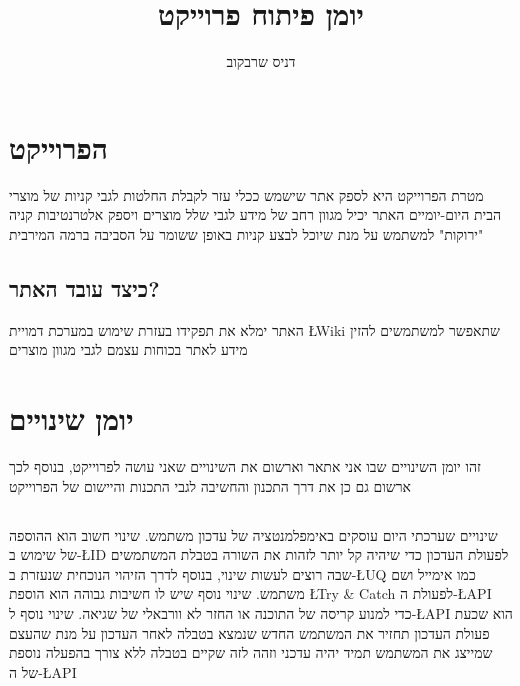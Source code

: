 \documentclass{article}
\title{יומן פיתוח פרוייקט}
\author{דניס שרבקוב}
\date{\displaydate{Initialcreation}}
\begin{document}
\maketitle

\tableofcontents

\newpage
\section{הפרוייקט}
מטרת הפרוייקט היא לספק אתר שישמש ככלי עזר לקבלת החלטות לגבי קניות של מוצרי הבית היום-יומיים האתר יכיל מגוון רחב של מידע לגבי שלל מוצרים ויספק אלטרנטיבות קניה "ירוקות" למשתמש על מנת שיוכל לבצע קניות באופן ששומר על הסביבה ברמה המירבית
\subsection{כיצד עובד האתר?}
האתר ימלא את תפקידו בעזרת שימוש במערכת דמויית \L{Wiki} שתאפשר למשתמשים להזין מידע לאתר בכוחות עצמם לגבי מגוון מוצרים
\newpage

\section{יומן שינויים}
זהו יומן השינויים שבו אני אתאר וארשום את השינויים שאני עושה לפרוייקט, בנוסף לכך ארשום גם כן את דרך התכנון והחשיבה לגבי התכנות והיישום של הפרוייקט 

\subsection{\protect{}}

שינויים שערכתי היום עוסקים באימפלמנטציה של עדכון משתמש. שינוי חשוב הוא ההוספה של שימוש ב-\L{ID} לפעולת העדכון כדי שיהיה קל יותר לזהות את השורה בטבלת המשתמשים שבה רוצים לעשות שינוי, בנוסף לדרך הזיהוי הנוכחית שנעזרת ב-\L{UQ} כמו אימייל ושם משתמש. שינוי נוסף שיש לו חשיבות גבוהה הוא הוספת \L{Try \& Catch} לפעולת ה-\L{API} כדי למנוע קריסה של התוכנה או החזר לא וורבאלי של שגיאה. שינוי נוסף ל-\L{API} הוא שכעת פעולת העדכון תחזיר את המשתמש החדש שנמצא בטבלה לאחר העדכון על מנת שהעצם שמייצג את המשתמש תמיד יהיה עדכני וזהה לזה שקיים בטבלה ללא צורך בהפעלה נוספת של ה-\L{API}
\end{document}
